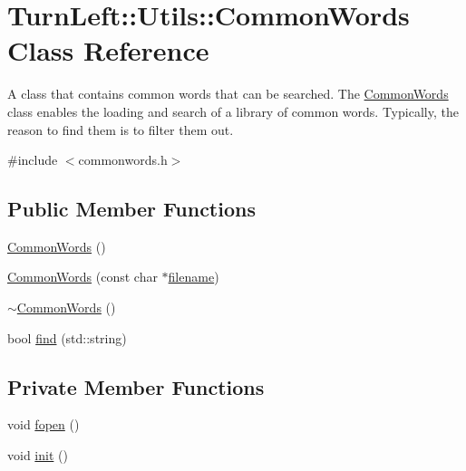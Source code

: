 \hypertarget{classTurnLeft_1_1Utils_1_1CommonWords}{
\section{TurnLeft::Utils::CommonWords Class Reference}
\label{classTurnLeft_1_1Utils_1_1CommonWords}
}


A class that contains common words that can be searched. The \hyperlink{classTurnLeft_1_1Utils_1_1CommonWords}{CommonWords} class enables the loading and search of a library of common words. Typically, the reason to find them is to filter them out.  




{\ttfamily \#include $<$commonwords.h$>$}

\subsection*{Public Member Functions}
\begin{DoxyCompactItemize}
\item 
\hyperlink{classTurnLeft_1_1Utils_1_1CommonWords_a5fd443eff06ae619cfa2f6191e4e1959}{CommonWords} ()
\item 
\hyperlink{classTurnLeft_1_1Utils_1_1CommonWords_ae9799b4dcea1caa3f13263ddfcb17a2d}{CommonWords} (const char $\ast$\hyperlink{classTurnLeft_1_1Utils_1_1CommonWords_aad1fbed4daae28a7e3023f2dcca967bc}{filename})
\item 
\hyperlink{classTurnLeft_1_1Utils_1_1CommonWords_a1e016e619f21c72f00967572956be10e}{$\sim$CommonWords} ()
\item 
bool \hyperlink{classTurnLeft_1_1Utils_1_1CommonWords_a17fd3176d631231bfdc9007ea27d3dcd}{find} (std::string)
\end{DoxyCompactItemize}
\subsection*{Private Member Functions}
\begin{DoxyCompactItemize}
\item 
void \hyperlink{classTurnLeft_1_1Utils_1_1CommonWords_a9321eea96b880922e9469c8ae8c4e24d}{fopen} ()
\item 
void \hyperlink{classTurnLeft_1_1Utils_1_1CommonWords_abfe3e0005d694c24214529661cc2e190}{init} ()
\end{DoxyCompactItemize}
